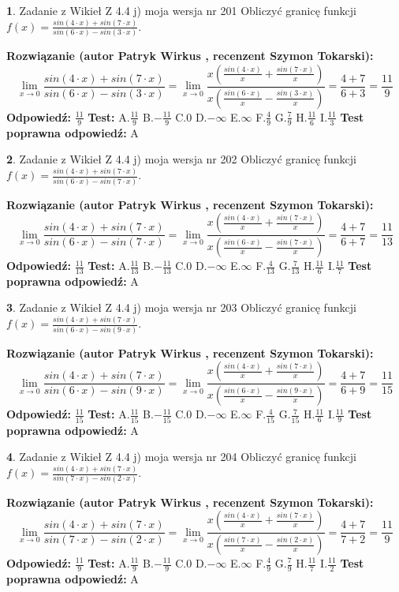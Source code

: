 \documentclass[12pt, a4paper]{article}
\theoremstyle{definition} %
\newtheorem{zad}{}
\newcommand{\zadStart}[1]{\begin{zad}#1\newline}
\newcommand{\zadStop}{\end{zad}}
\newcommand{\rozwStart}[2]{\noindent \textbf{Rozwiązanie (autor #1 , recenzent #2): }\newline}
\newcommand{\rozwStop}{\newline}
\newcommand{\odpStart}{\noindent \textbf{Odpowiedź:}\newline}
\newcommand{\odpStop}{\newline}
\newcommand{\testStart}{\noindent \textbf{Test:}\newline}
\newcommand{\testStop}{\newline}
\newcommand{\kluczStart}{\noindent \textbf{Test poprawna odpowiedź:}\newline}
\newcommand{\kluczStop}{\newline}
\begin{document}
\zadStart{Zadanie z Wikieł Z 4.4 j) moja wersja nr 201}
Obliczyć granicę funkcji $f(x)=\frac{sin(4\cdot x) +sin(7\cdot x)}{sin(6\cdot x) -sin(3\cdot x)}$.
\zadStop
\rozwStart{Patryk Wirkus}{Szymon Tokarski}
$$\lim\limits_{x\to 0}\frac{sin(4\cdot x) +sin(7\cdot x)}{sin(6\cdot x) -sin(3\cdot x)}=\lim\limits_{x\to 0}\frac{x(\frac{sin(4\cdot x)}{x}+\frac{sin(7\cdot x)}{x})}{x(\frac{sin(6\cdot x)}{x}-\frac{sin(3\cdot x)}{x})}=\frac{4+7}{6+3} = \frac{11}{9}$$
\rozwStop
\odpStart
$\frac{11}{9}$
\odpStop
\testStart
A.$\frac{11}{9}$
B.$-\frac{11}{9}$
C.$0$
D.$-\infty$
E.$\infty$
F.$\frac{4}{9}$
G.$\frac{7}{9}$
H.$\frac{11}{6}$
I.$\frac{11}{3}$
\testStop
\kluczStart
A
\kluczStop



\zadStart{Zadanie z Wikieł Z 4.4 j) moja wersja nr 202}
Obliczyć granicę funkcji $f(x)=\frac{sin(4\cdot x) +sin(7\cdot x)}{sin(6\cdot x) -sin(7\cdot x)}$.
\zadStop
\rozwStart{Patryk Wirkus}{Szymon Tokarski}
$$\lim\limits_{x\to 0}\frac{sin(4\cdot x) +sin(7\cdot x)}{sin(6\cdot x) -sin(7\cdot x)}=\lim\limits_{x\to 0}\frac{x(\frac{sin(4\cdot x)}{x}+\frac{sin(7\cdot x)}{x})}{x(\frac{sin(6\cdot x)}{x}-\frac{sin(7\cdot x)}{x})}=\frac{4+7}{6+7} = \frac{11}{13}$$
\rozwStop
\odpStart
$\frac{11}{13}$
\odpStop
\testStart
A.$\frac{11}{13}$
B.$-\frac{11}{13}$
C.$0$
D.$-\infty$
E.$\infty$
F.$\frac{4}{13}$
G.$\frac{7}{13}$
H.$\frac{11}{6}$
I.$\frac{11}{7}$
\testStop
\kluczStart
A
\kluczStop



\zadStart{Zadanie z Wikieł Z 4.4 j) moja wersja nr 203}
Obliczyć granicę funkcji $f(x)=\frac{sin(4\cdot x) +sin(7\cdot x)}{sin(6\cdot x) -sin(9\cdot x)}$.
\zadStop
\rozwStart{Patryk Wirkus}{Szymon Tokarski}
$$\lim\limits_{x\to 0}\frac{sin(4\cdot x) +sin(7\cdot x)}{sin(6\cdot x) -sin(9\cdot x)}=\lim\limits_{x\to 0}\frac{x(\frac{sin(4\cdot x)}{x}+\frac{sin(7\cdot x)}{x})}{x(\frac{sin(6\cdot x)}{x}-\frac{sin(9\cdot x)}{x})}=\frac{4+7}{6+9} = \frac{11}{15}$$
\rozwStop
\odpStart
$\frac{11}{15}$
\odpStop
\testStart
A.$\frac{11}{15}$
B.$-\frac{11}{15}$
C.$0$
D.$-\infty$
E.$\infty$
F.$\frac{4}{15}$
G.$\frac{7}{15}$
H.$\frac{11}{6}$
I.$\frac{11}{9}$
\testStop
\kluczStart
A
\kluczStop



\zadStart{Zadanie z Wikieł Z 4.4 j) moja wersja nr 204}
Obliczyć granicę funkcji $f(x)=\frac{sin(4\cdot x) +sin(7\cdot x)}{sin(7\cdot x) -sin(2\cdot x)}$.
\zadStop
\rozwStart{Patryk Wirkus}{Szymon Tokarski}
$$\lim\limits_{x\to 0}\frac{sin(4\cdot x) +sin(7\cdot x)}{sin(7\cdot x) -sin(2\cdot x)}=\lim\limits_{x\to 0}\frac{x(\frac{sin(4\cdot x)}{x}+\frac{sin(7\cdot x)}{x})}{x(\frac{sin(7\cdot x)}{x}-\frac{sin(2\cdot x)}{x})}=\frac{4+7}{7+2} = \frac{11}{9}$$
\rozwStop
\odpStart
$\frac{11}{9}$
\odpStop
\testStart
A.$\frac{11}{9}$
B.$-\frac{11}{9}$
C.$0$
D.$-\infty$
E.$\infty$
F.$\frac{4}{9}$
G.$\frac{7}{9}$
H.$\frac{11}{7}$
I.$\frac{11}{2}$
\testStop
\kluczStart
A
\kluczStop
\end{document}
